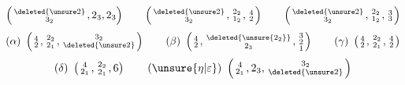 \[
\left(\begin{smallmatrix}\deleted{\unsure2}\\3_2\end{smallmatrix},2_3,2_3\right)\qquad \left(\begin{smallmatrix}\deleted{\unsure2}\\3_2\end{smallmatrix},\begin{smallmatrix}2_2\\1_2\end{smallmatrix},\begin{smallmatrix}4\\2\end{smallmatrix}\right)\qquad \left(\begin{smallmatrix}\deleted{\unsure2}\\3_2\end{smallmatrix},\begin{smallmatrix}2_2\\1_2\end{smallmatrix},\begin{smallmatrix}3\\3\end{smallmatrix}\right)
\]
\[
(\alpha)\ \left(\begin{smallmatrix}4\\2\end{smallmatrix},\begin{smallmatrix}2_2\\2_1\end{smallmatrix},\begin{smallmatrix}3_2\\\deleted{\unsure2}\end{smallmatrix}\right)\qquad (\beta)\ \left(\begin{smallmatrix}4\\2\end{smallmatrix},\begin{smallmatrix}\deleted{\unsure{2_2}}\\2_3\end{smallmatrix},\begin{smallmatrix}3\\2\\1\end{smallmatrix}\right)\qquad (\gamma)\ \left(\begin{smallmatrix}4\\2\end{smallmatrix},\begin{smallmatrix}2_2\\2_1\end{smallmatrix},\begin{smallmatrix}4\\2\end{smallmatrix}\right)
\]
\[
(\delta)\ \left(\begin{smallmatrix}4\\2_1\end{smallmatrix},\begin{smallmatrix}2_2\\2_1\end{smallmatrix},6\right)\qquad (\unsure{\eta|\varepsilon})\ \left(\begin{smallmatrix}4\\2_1\end{smallmatrix},2_3,\begin{smallmatrix}3_2\\\deleted{\unsure2}\end{smallmatrix}\right)
\]
